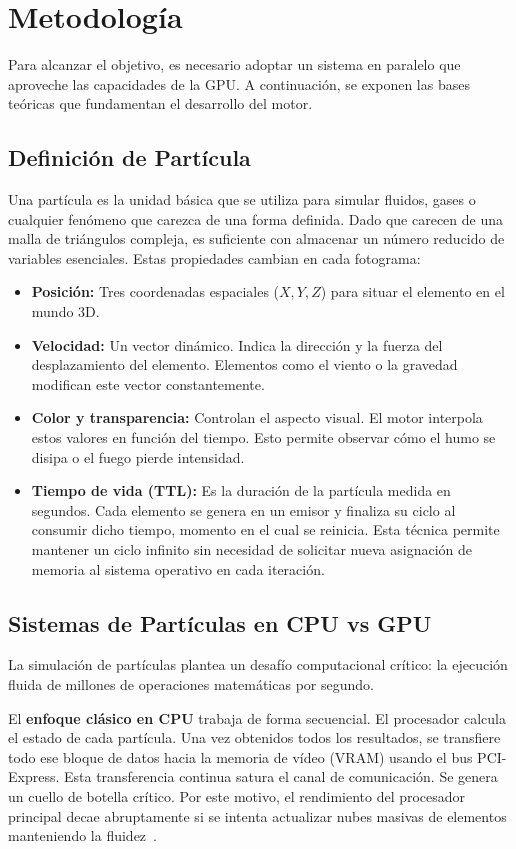 \chapter{Metodología} 
\label{sec:metodologia}

Para alcanzar el objetivo, es necesario adoptar un sistema en paralelo que aproveche las capacidades de la GPU. A continuación, se exponen las bases teóricas que fundamentan el desarrollo del motor.


\section{Definición de Partícula}
Una partícula es la unidad básica que se utiliza para simular fluidos, gases o cualquier fenómeno que carezca de una forma definida.
Dado que carecen de una malla de triángulos compleja, es suficiente con almacenar un número reducido de variables esenciales. Estas propiedades cambian en cada fotograma:
\begin{itemize}
    \item \textbf{Posición:} Tres coordenadas espaciales ($X, Y, Z$) para situar el elemento en el mundo 3D.
    \item \textbf{Velocidad:} Un vector dinámico. Indica la dirección y la fuerza del desplazamiento del elemento. Elementos como el viento o la gravedad modifican este vector constantemente.
    \item \textbf{Color y transparencia:} Controlan el aspecto visual. El motor interpola estos valores en función del tiempo. Esto permite observar cómo el humo se disipa o el fuego pierde intensidad.
    \item \textbf{Tiempo de vida (TTL):} Es la duración de la partícula medida en segundos. Cada elemento se genera en un emisor y finaliza su ciclo al consumir dicho tiempo, momento en el cual se reinicia. Esta técnica permite mantener un ciclo infinito sin necesidad de solicitar nueva asignación de memoria al sistema operativo en cada iteración.
\end{itemize}



\section{Sistemas de Partículas en CPU vs GPU}
La simulación de partículas plantea un desafío computacional crítico: la ejecución fluida de millones de operaciones matemáticas por segundo.

El \textbf{enfoque clásico en CPU} trabaja de forma secuencial. El procesador calcula el estado de cada partícula. 
Una vez obtenidos todos los resultados, se transfiere todo ese bloque de datos hacia la memoria de vídeo (VRAM) usando el bus PCI-Express. 
Esta transferencia continua satura el canal de comunicación. Se genera un cuello de botella crítico. 
Por este motivo, el rendimiento del procesador principal decae abruptamente si se intenta actualizar nubes masivas de elementos manteniendo la fluidez~\parencite{latta2004massively}.

